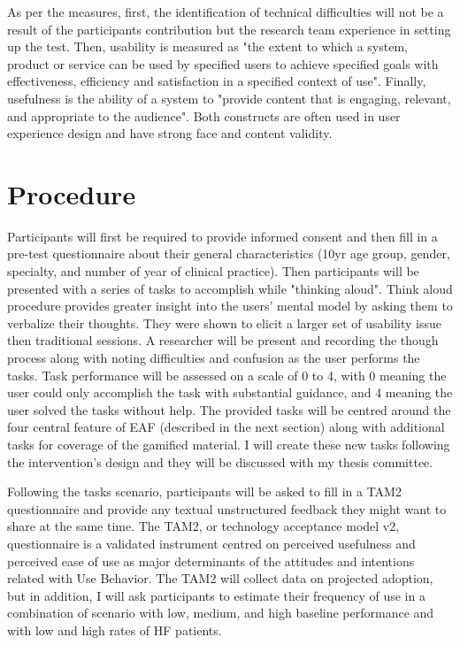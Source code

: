 As per the measures, first, the identification of technical difficulties will not be a result of the participants contribution but the research team experience in setting up the test. Then, usability is measured as "the extent to which a system, product or service can be used by specified users to achieve specified goals with effectiveness, efficiency and satisfaction in a specified context of use".\cite{international1998iso} Finally, usefulness is the ability of a system to "provide content that is engaging, relevant, and appropriate to the audience". Both constructs are often used in user experience design and have strong face and content validity.\cite{united2006research}

\section{Procedure}
Participants will first be required to provide informed consent and then fill in a pre-test questionnaire about their general characteristics (10yr age group, gender, specialty, and number of year of clinical practice). Then participants will be presented with a series of tasks to accomplish while "thinking aloud". Think aloud procedure provides greater insight into the users' mental model by asking them to verbalize their thoughts. They were shown to elicit a larger set of usability issue then traditional sessions. \cite{ericsson1980verbal} A researcher will be present and recording the though process along with noting difficulties and confusion as the user performs the tasks. Task performance will be assessed on a scale of 0 to 4, with 0 meaning the user could only accomplish the task with substantial guidance, and 4 meaning the user solved the tasks without help. The provided tasks will be centred around the four central feature of \gls{EAF} (described in the next section) along with additional tasks for coverage of the gamified material. I will create these new tasks following the intervention's design and they will be discussed with my thesis committee.

Following the tasks scenario, participants will be asked to fill in a TAM2 questionnaire and provide any textual unstructured feedback they might want to share at the same time. The TAM2, or technology acceptance model v2, questionnaire is a validated instrument centred on perceived usefulness and perceived ease of use as major determinants of the attitudes and intentions related with Use Behavior.\cite{venkatesh2000theoretical} The TAM2 will collect data on projected adoption, but in addition, I will ask participants to estimate their frequency of use in a combination of scenario with low, medium, and high baseline performance and with low and high rates of HF patients.

